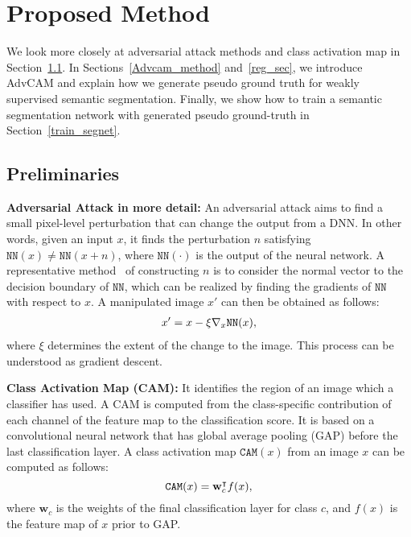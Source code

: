 \documentclass[final]{cvpr}
\begin{document}
\section{Proposed Method}
We look more closely at adversarial attack methods and class activation map in Section~\ref{adv_attack_method}.
In Sections~\ref{Advcam_method} and~\ref{reg_sec}, we introduce AdvCAM and explain how we generate pseudo ground truth for weakly supervised semantic segmentation. Finally, we show how to train a semantic segmentation network with generated pseudo ground-truth in Section~\ref{train_segnet}. 



\subsection{Preliminaries}\label{adv_attack_method}
\noindent\textbf{Adversarial Attack in more detail:} An adversarial attack aims to find a small pixel-level perturbation that can change the output from a DNN.
In other words, given an input $x$, it finds the perturbation $n$ satisfying $\texttt{NN}(x) \neq \texttt{NN}(x+n)$, where $\texttt{NN}(\mathord{\cdot})$ is the output of the neural network.
A representative method~\cite{goodfellow2014explaining} of constructing $n$ is to consider the normal vector to the decision boundary of $\texttt{NN}$, which can be realized by finding the gradients of $\texttt{NN}$ with respect to $x$. 
A manipulated image $x'$ can then be obtained as follows:
\vspace{-0.2em}
\begin{align}\label{adv_attack}
x' = x - \xi \nabla_x \texttt{NN}(x),
\vspace{-0.8em}
\end{align}
where $\xi$ determines the extent of the change to the image. This process can be understood as gradient descent.



\noindent\textbf{Class Activation Map (CAM):}
It identifies the region of an image which a classifier has used.
A CAM is computed from the class-specific contribution of each channel of the feature map to the classification score. It is based on a convolutional neural network that has global average pooling (GAP) before the last classification layer. 
A class activation map $\texttt{CAM}(x)$ from an image $x$ can be computed as follows:
\vspace{-0.4em}
\begin{equation}\label{cam}
\texttt{CAM}(x) = \mathbf{w}^\intercal_c f(x),
\vspace{-0.4em}
\end{equation}
where $\mathbf{w}_c$ is the weights of the final classification layer for class $c$, and $f(x)$ is the feature map of $x$ prior to GAP.
\end{document}
